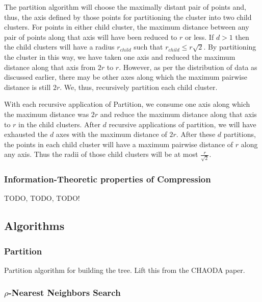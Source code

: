 The partition algorithm will choose the maximally distant pair of points and, thus, the axis defined by those points for partitioning the cluster into two child clusters.
For points in either child cluster, the maximum distance between any pair of points along that axis will have been reduced to $r$ or less.
If $d > 1$ then the child clusters will have a radius $r_{child}$ such that $r_{child} \leq r \sqrt{2}$.
By partitioning the cluster in this way, we have taken one axis and reduced the maximum distance along that axis from $2r$ to $r$.
However, as per the distribution of data as discussed earlier, there may be other axes along which the maximum pairwise distance is still $2r$.
We, thus, recursively partition each child cluster.

With each recursive application of Partition, we consume one axis along which the maximum distance was $2r$ and reduce the maximum distance along that axis to $r$ in the child clusters.
After $d$ recursive applications of partition, we will have exhausted the $d$ axes with the maximum distance of $2r$.
After these $d$ partitions, the points in each child cluster will have a maximum pairwise distance of $r$ along any axis.
Thus the radii of those child clusters will be at most $\frac{r}{\sqrt{2}}$.

\subsubsection{Information-Theoretic properties of Compression}
\label{subsubsec:methods:proofs:information-theoretic-properties-of-compression}

TODO, TODO, TODO!

\subsection{Algorithms}
\label{subsec:methods:algorithms}

\subsubsection{Partition}
\label{subsubsec:methods:algorithms:partition}

Partition algorithm for building the tree.
Lift this from the CHAODA paper.

\subsubsection{$\rho$-Nearest Neighbors Search}
\label{subsubsec:methods:algorithms:rnn-search}

